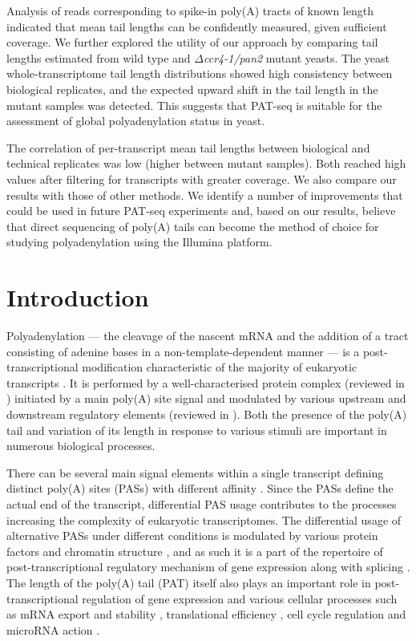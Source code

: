 \documentclass[10pt]{article}
\begin{document}
Analysis of reads corresponding to spike-in poly(A) tracts of known length indicated that mean tail lengths can be confidently measured, given sufficient coverage. We further explored the utility of our approach by comparing tail lengths estimated from wild type and \textit{$\Delta$ccr4-1/pan2} mutant yeasts. The yeast whole-transcriptome tail length distributions showed high consistency between biological replicates, and the expected upward shift in the tail length in the mutant samples was detected. This suggests that PAT-seq is suitable for the assessment of global polyadenylation status in yeast.

The correlation of per-transcript mean tail lengths between biological and technical replicates was low (higher between mutant samples). Both reached high values after filtering for transcripts with greater coverage. We also compare our results with those of other methods. We identify a number of improvements that could be used in future PAT-seq experiments and, based on our results, believe that direct sequencing of poly(A) tails can become the method of choice for studying polyadenylation using the Illumina platform.

\section*{Introduction}

Polyadenylation --- the cleavage of the nascent mRNA and the addition of a tract consisting of adenine bases in a non-template-dependent manner --- is a post-transcriptional modification characteristic of the majority of eukaryotic transcripts \cite{zhao99,elkon13,tian13}. It is performed by a well-characterised protein complex (reviewed in \cite{zhao99}) initiated by a main poly(A) site signal and modulated by various upstream and downstream regulatory elements (reviewed in \cite{tian11,weill12}). Both the presence of the poly(A) tail and variation of its length in response to various stimuli are important in numerous biological processes.

There can be several main signal elements within a single transcript defining distinct poly(A) sites (PASs) with different affinity \cite{tian13,elkon13}. Since the PASs define the actual end of the transcript, differential PAS usage contributes to the processes increasing the complexity of eukaryotic transcriptomes. The differential usage of alternative PASs under different conditions is modulated by various protein factors and chromatin structure \cite{tian13}, and as such it is a part of the repertoire of post-transcriptional regulatory mechanism of gene expression along with splicing \cite{licatalosi10}. The length of the poly(A) tail (PAT) itself also plays an important role in post-transcriptional regulation of gene expression and various cellular processes such as mRNA export \cite{fuke07} and stability \cite{lackner07,eckmann11,weill12}, translational efficiency \cite{weill12}, cell cycle regulation \cite{mendez01} and microRNA action \cite{moretti12}.
\end{document}
